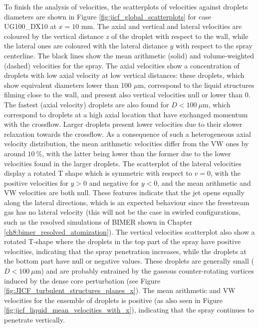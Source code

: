 To finish the analysis of velocities, the scatterplots of velocities against droplets diameters are shown in Figure \ref{fig:jicf_global_scatterplots} for case UG100\_DX10 at $x = 10$ mm. The axial and vertical and lateral velocities are coloured by the vertical distance $z$ of the droplet with respect to the wall, while the lateral ones are coloured with the lateral distance $y$ with respect to the spray centerline. The black lines show the mean arithmetic (solid) and volume-weighted (dashed) velocities for the spray. The axial velocities show a concentration of droplets with low axial velocity at low vertical distances: these droplets, which show equivalent diameters lower than 100 $\mu$m, correspond to the liquid structures filming close to the wall, and present also vertical velocities null or lower than 0. The fastest (axial velocity) droplets are also found for $D < 100 ~\mu$m, which correspond to droplets at a high axial location that have exchanged momentum with the crossflow. Larger droplets present lower velocities due to their slower relaxation towards the crossflow. As a consequence of such a heterogeneous axial velocity distribution, the mean arithmetic velocities differ from the VW ones by around $10~\%$, with the latter being lower than the former due to the lower velocities found in the larger droplets. The scatterplot of the lateral velocities display a rotated T shape which is symmetric with respect to $v = 0$, with the positive velocities for $y > 0$ and negative for $y < 0$, and the mean arithmetic and VW velocities are both null. These features indicate that the jet opens equally along the lateral directions, which is an expected behaviour since the freestream gas has no lateral velocity (this will not be the case in swirled configurations, such as the resolved simulations of BIMER shown in Chapter \ref{ch8:bimer_resolved_atomization}). The vertical velocities scatterplot also show a rotated T-shape where the droplets in the top part of the spray have positive velocities, indicating that the spray penetration increases, while the droplets at the bottom part have null or negative values. These droplets are generally small ($D < 100~\mu$m) and are probably entrained by the gaseous counter-rotating vortices induced by the dense core perturbation (see Figure \ref{fig:JICF_turbulent_structures_planes_x}). The mean arithmetic and VW velocities for the ensemble of droplets is positive (as also seen in Figure \ref{fig:jicf_liquid_mean_velocities_with_x}), indicating that the spray continues to penetrate vertically. 



